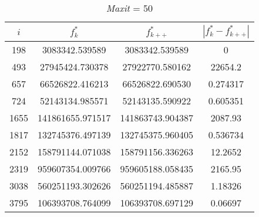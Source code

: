 \documentclass[12pt,a4paper,oneside,hidelinks]{report}
\begin{document}
\begin{table}[h]\ContinuedFloat%
	\centering
	
	\def\arraystretch{1.4}
	
	\begin{subtable}{\textwidth}
		\centering
		\begin{tabular}{|S[table-parse-only = true]
						|S[table-format = 9.6, table-number-alignment = center]
						|S[table-format = 9.6, table-number-alignment = center]
						|S[table-parse-only = true]|}
			
			\hline			
			{$i$} & {$f_{k}^*$} & {$f_{k++}^*$} & {$|f_{k}^* - f_{k++}^*|$} \\			
			
			\hline	
			
			198  &  3083342.539589   & 3083342.539589   & 0  \\
			493  &  27945424.730378  & 27922770.580162  & 22654.2  \\
			657  &  66526822.416213  & 66526822.690530  & 0.274317 \\
			724  &  52143134.985571  & 52143135.590922  & 0.605351\\
			1655 &  141861655.971517 & 141863743.904387 & 2087.93 \\
			1817 &  132745376.497139 & 132745375.960405 & 0.536734 \\
			2152 &	158791144.071038 & 158791156.336263 & 12.2652 \\
			2319 &  959607354.009766 & 959605188.058435 & 2165.95 \\
			3038 &  560251193.302626 & 560251194.485887 & 1.18326 \\
			3795 &  106393708.764099 & 106393708.697129 & 0.06697 \\			
			
			\hline
		\end{tabular}
		
		\vspace*{0.4 cm}
		\caption{\textit{Maxit} = 50}
	\end{subtable}%
\end{table}
\end{document}
